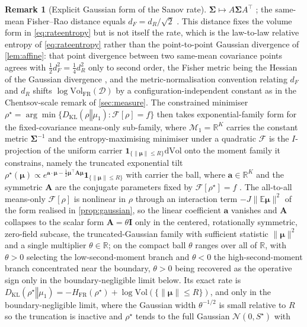 \documentclass[11pt]{article}
\theoremstyle{plain}
\theoremstyle{definition}
\newtheorem{remark}{Remark}[section]
\newcommand{\KL}[2]{D_{\mathrm{KL}}\mathopen{}\left(#1 \mathbin{\Vert} #2\right)\mathclose{}}
\newcommand{\E}{\mathbb{E}}
\newcommand{\R}{\mathbb{R}}
\newcommand{\dd}{\mathrm{d}}
\newcommand{\bmu}{\boldsymbol{\mu}}
\newcommand{\bSigma}{\boldsymbol{\Sigma}}
\newcommand{\bI}{\mathbf{I}}
\newcommand{\Fcal}{\mathcal{F}}
\newcommand{\Dcal}{\mathcal{D}}
\newcommand{\Mcal}{\mathcal{M}}
\newcommand{\Ncal}{\mathcal{N}}
\begin{document}
\begin{remark}[Explicit Gaussian form of the Sanov rate]
$\bSigma\mapsto A\bSigma A^{\top}$ \citep{pennec2006riemannian}; the same-mean Fisher--Rao
distance equals $d_F=d_R/\sqrt2$ \citep{pinele2020fisher}. This distance fixes the volume
form in \cref{eq:rateentropy} but is not itself the rate, which is the law-to-law relative
entropy of \cref{eq:rateentropy} rather than the point-to-point Gaussian divergence of
\cref{lem:affine}: that point divergence between two same-mean covariance points agrees
with $\tfrac12 d_F^2=\tfrac14 d_R^2$ only to second order, the Fisher metric being the
Hessian of the Gaussian divergence \citep{amari2000methods,nielsen2020elementary}, and the
metric-normalisation convention relating $d_F$ and $d_R$ shifts
$\log\mathrm{Vol}_{\mathrm{FR}}(\Dcal)$ by a configuration-independent constant as in the
Chentsov-scale remark of \cref{sec:measure}. The constrained minimiser
$\rho^{\star}=\arg\min\{\KL{\rho}{\mu_1}:\Fcal[\rho]=f\}$ then takes exponential-family form for
the fixed-covariance means-only sub-family, where $\Mcal_1=\R^{K}$ carries the constant
metric $\bSigma^{-1}$ and the entropy-maximising minimiser under a quadratic $\Fcal$ is the
$I$-projection of the uniform carrier $\mathbf 1_{\{\lVert\bmu\rVert\le R\}}\dd\mathrm{Vol}$ onto the
moment family it constrains, namely the truncated exponential tilt
$\rho^{\star}(\bmu)\propto e^{\mathbf a\cdot\bmu-\tfrac12\bmu^{\top}\mathbf A\bmu}\mathbf 1_{\{\lVert\bmu\rVert\le R\}}$
with carrier the ball, where $\mathbf a\in\R^{K}$ and the symmetric $\mathbf A$ are the conjugate
parameters fixed by $\Fcal[\rho^{\star}]=f$ \citep{csiszar1975iprojection,cover2006elements}. The
all-to-all means-only $\Fcal[\rho]$ is nonlinear in $\rho$ through an interaction term
$-J\lVert\E\bmu\rVert^{2}$ of the form realised in \cref{prop:gaussian}, so the linear coefficient
$\mathbf a$ vanishes and $\mathbf A$ collapses to the scalar form $\mathbf A=\theta\bI$ only in the
centered, rotationally symmetric, zero-field subcase, the truncated-Gaussian family with sufficient
statistic $\lVert\bmu\rVert^{2}$ and a single multiplier $\theta\in\R$; on the compact ball $\theta$
ranges over all of $\R$, with $\theta>0$ selecting the low-second-moment branch and $\theta<0$ the
high-second-moment branch concentrated near the boundary, $\theta>0$ being recovered as the operative
sign only in the boundary-negligible limit below. Its exact rate is
$\KL{\rho^{\star}}{\mu_1}=-H_{\mathrm{FR}}(\rho^{\star})+\log\mathrm{Vol}(\{\lVert\bmu\rVert\le R\})$, and only in the
boundary-negligible limit, where the Gaussian width $\theta^{-1/2}$ is small relative to $R$ so the
truncation is inactive and $\rho^{\star}$ tends to the full Gaussian $\Ncal(0,S^{\star})$ with

\end{remark}
\end{document}
